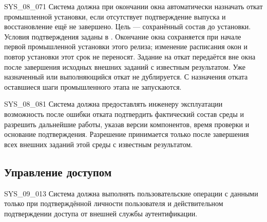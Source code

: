 \documentclass{tpks}
\begin{document}
\begin{req}{SYS_08_07}{1}
Система должна при окончании окна автоматически назначать откат промышленной
установки, если отсутствует подтверждение выпуска и восстановление ещё не завершено.
Цель --- сохранённый состав до установки. Условия подтверждения заданы в .
Окончание окна сохраняется при начале первой промышленной установки этого релиза;
изменение расписания окон и повтор установки этот срок не переносят.
Задание на откат передаётся вне окна после завершения исходных внешних заданий
с известным результатом. Уже назначенный или выполняющийся откат не дублируется.
С назначения отката оставшиеся шаги промышленного этапа не запускаются.
\end{req}

\begin{req}{SYS_08_08}{1}
Система должна предоставлять инженеру эксплуатации возможность после ошибки отката
подтвердить фактический состав среды и разрешить дальнейшие работы, указав версии
компонентов, время проверки и основание подтверждения. Разрешение принимается
только после завершения всех внешних заданий этой среды с известным результатом.
\end{req}

\subsection{Управление доступом}

\begin{req}{SYS_09_01}{3}
Система должна выполнять пользовательские операции с данными только при
подтверждённой личности пользователя и действительном подтверждении доступа
от внешней службы аутентификации.
\end{req}
\end{document}
